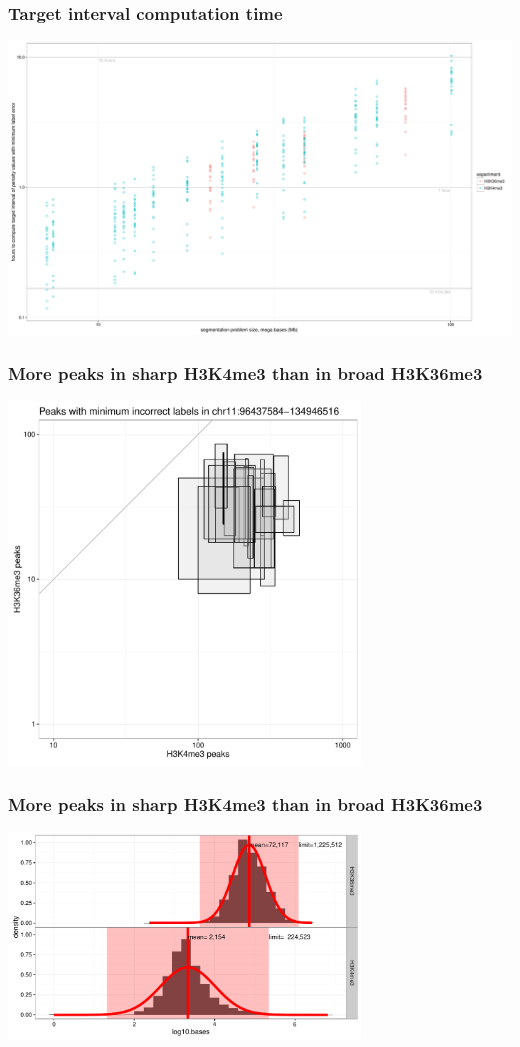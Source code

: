 \documentclass{beamer}
\begin{document}
\begin{frame}
  \frametitle{Target interval computation time}
  \includegraphics[width=\textwidth]{figure-target-interval-time}
\end{frame}

\begin{frame}
  \frametitle{More peaks in sharp H3K4me3 than in broad H3K36me3}
  \includegraphics[width=0.7\textwidth]{figure-min-err-peaks-compare}
\end{frame}

\begin{frame}
  \frametitle{More peaks in sharp H3K4me3 than in broad H3K36me3}
  \includegraphics[width=0.7\textwidth]{figure-peak-size-model}
\end{frame}
\end{document}
